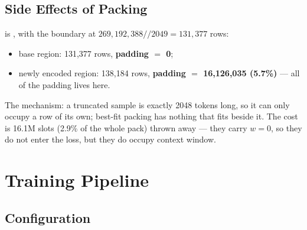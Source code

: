 \subsection{Side Effects of Packing}
\label{sec:en-data-packing}

 is ,
with the boundary at $269{,}192{,}388 // 2049 = 131{,}377$ rows:

\begin{itemize}
\item base region: 131,377 rows, \textbf{padding $=$ 0};
\item newly encoded region: 138,184 rows, \textbf{padding $=$ 16,126,035 (5.7\%)} --- all
      of the padding lives here.
\end{itemize}

The mechanism: a truncated sample is exactly 2048 tokens long, so it can only occupy a row
of its own; best-fit packing has nothing that fits beside it. The cost is 16.1M slots
(2.9\% of the whole pack) thrown away --- they carry $w = 0$, so they do not enter the
loss, but they do occupy context window.

\section{Training Pipeline}
\label{sec:en-pipe}

\subsection{Configuration}
\label{sec:en-pipe-config}

